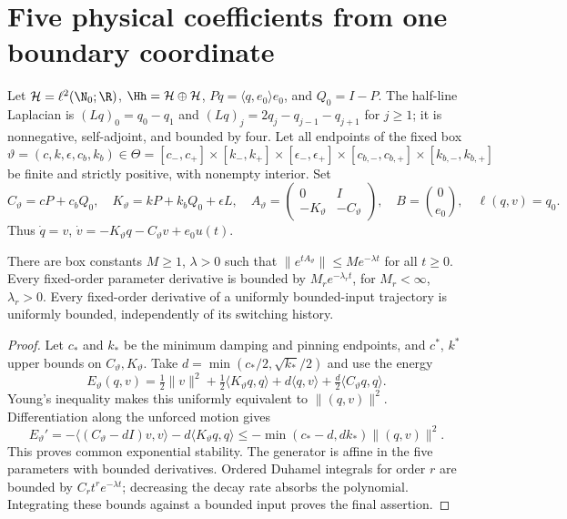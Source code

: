 \section{Five physical coefficients from one boundary coordinate}
\label{sec:lattice}
Let \(\mathcal H=\ell^2(\N_0;\R)\), \(\Hh=\mathcal H\oplus\mathcal H\),
\(Pq=\langle q,e_0\rangle e_0\), and \(Q_0=I-P\). The half-line
Laplacian is \((Lq)_0=q_0-q_1\) and
\((Lq)_j=2q_j-q_{j-1}-q_{j+1}\) for \(j\ge1\); it is nonnegative,
self-adjoint, and bounded by four. Let all endpoints of the fixed box
\[
 \vartheta=(c,k,\epsilon,c_b,k_b)\in\Theta
 =[c_-,c_+]\times[k_-,k_+]\times[\epsilon_-,\epsilon_+]
 \times[c_{b,-},c_{b,+}]\times[k_{b,-},k_{b,+}]
\]
be finite and strictly positive, with nonempty interior. Set
\[
 C_\vartheta=cP+c_bQ_0,\quad
 K_\vartheta=kP+k_bQ_0+\epsilon L,\quad
 A_\vartheta=\begin{pmatrix}0&I\\-K_\vartheta&-C_\vartheta\end{pmatrix},
 \quad B=\binom0{e_0},\quad \ell(q,v)=q_0.
\]
Thus \(\dot q=v\), \(\dot v=-K_\vartheta q-C_\vartheta v+e_0u(t)\).

\begin{lemma}
\label{lem:five-energy}
There are box constants \(M\ge1\), \(\lambda>0\) such that
\(\|e^{tA_\vartheta}\|\le Me^{-\lambda t}\) for all \(t\ge0\).
Every fixed-order parameter derivative is bounded by
\(M_r e^{-\lambda_rt}\), for \(M_r<\infty\), \(\lambda_r>0\).
Every fixed-order derivative of a uniformly bounded-input trajectory is
uniformly bounded, independently of its switching history.
\end{lemma}
\begin{proof}
Let \(c_*\) and \(k_*\) be the minimum damping and pinning endpoints,
and \(c^*\), \(k^*\) upper bounds on \(C_\vartheta,K_\vartheta\).
Take \(d=\min(c_*/2,\sqrt{k_*}/2)\) and use the energy
\[
 E_\vartheta(q,v)=\tfrac12\|v\|^2+\tfrac12\langle K_\vartheta q,q\rangle
 +d\langle q,v\rangle+\tfrac d2\langle C_\vartheta q,q\rangle.
\]
Young's inequality makes this uniformly equivalent to \(\|(q,v)\|^2\).
Differentiation along the unforced motion gives
\[
 E_\vartheta'=-\langle(C_\vartheta-dI)v,v\rangle
 -d\langle K_\vartheta q,q\rangle
 \le-\min(c_*-d,dk_*)\|(q,v)\|^2.
\]
This proves common exponential stability. The generator is affine in the
five parameters with bounded derivatives. Ordered Duhamel integrals for
order \(r\) are bounded by \(C_rt^re^{-\lambda t}\); decreasing the decay
rate absorbs the polynomial. Integrating these bounds against a bounded
input proves the final assertion.
\end{proof}

